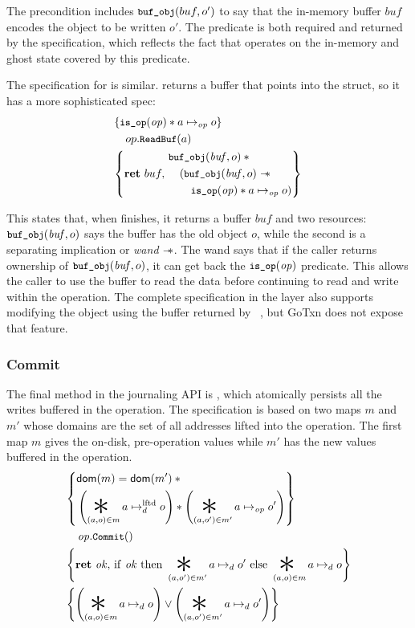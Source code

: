 The precondition includes $\cc{buf_obj}(buf, o')$ to say that the in-memory
buffer $buf$ encodes the object to be written $o'$.
The  predicate is both
required and returned by the specification, which reflects the fact that
 operates on the in-memory and ghost state covered by
this predicate.

The specification for  is similar. 
returns a buffer that points into the  struct, so it has a more
sophisticated spec:
%
\begin{align*}
  \hoareV{\isop \sep a \mapsto_{\mathit{op}} o}%
        {op.\cc{ReadBuf}(a)}%
        {\Ret{buf}
  \begin{aligned}
  &\cc{buf_obj}(\mathit{buf}, o) \sep \phantom{} \\
  &\quad( \cc{buf_obj}(\mathit{buf}, o) \wand \\
  &\quad\quad \isop \sep a \mapsto_{\mathit{op}} o )
    \end{aligned}}
\end{align*}

This states that, when  finishes, it returns a buffer $\mathit{buf}$
and two resources: $\cc{buf_obj}(\mathit{buf}, o)$ says the buffer has the old
object $o$, while the second is a separating implication or \emph{wand} $\mathrel{-\!\!\ast}$.
The wand says that if
the caller returns ownership of $\cc{buf_obj}(\mathit{buf}, o)$, it can get back
the $\cc{is_op}(\mathit{op})$ predicate. This allows the caller to use the
buffer to read the data before continuing to read and write within the
operation. The complete specification in the  layer also supports modifying the
object using the buffer returned by ~\cite{chajed:gojournal}, but
GoTxn does not expose that feature.

\subsubsection{Commit}

The final method in the journaling API is , which atomically
persists all the writes buffered in the operation. The specification is based on
two maps $m$ and $m'$ whose domains are the set of all addresses lifted into the
operation. The first map $m$ gives the on-disk, pre-operation values while $m'$
has the new values buffered in the operation.
\begin{align*}
  \hoareCV{ \begin{aligned}
              &\dom(m) = \dom(m') \sep {} \\
  &\left( \bigast_{(a,o) \in m} a \mapstoLftd o \right) \sep %
  \left( \bigast_{(a,o') \in m'} a \mapstoOp o' \right)
            \end{aligned}} %
  {\mathit{op}.\cc{Commit}()}%
  {\Ret{\mathit{ok}} \mathrm{if~} \mathit{ok} %
  \mathrm{~then~} \bigast_{(a,o') \in m'} a \mapstoDisk o' \mathrm{~else~} %
    \bigast_{(a,o) \in m} a \mapstoDisk o}%
  {\left( \bigast_{(a,o) \in m} a \mapstoDisk o \right) \lor
    \left( \bigast_{(a,o') \in m'} a \mapstoDisk o' \right) }
\end{align*}

